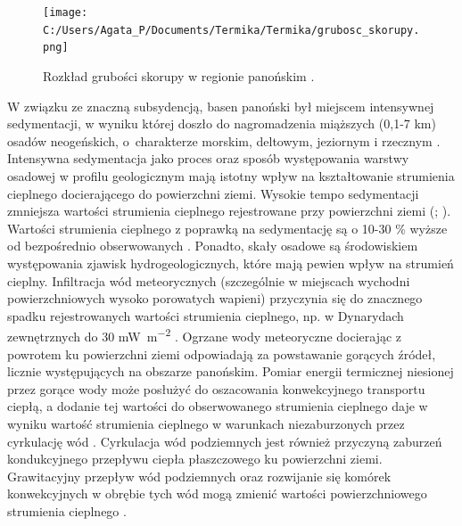 \documentclass[11.5pt,twoside]{report}
\begin{document}
\begin{figure}[h]
	\centering
	\texttt{[image: C:/Users/Agata\_P/Documents/Termika/Termika/grubosc\_skorupy.png]}
	\caption{Rozkład grubości skorupy w regionie panońskim \parencite{Horvath.2015}.}
	\label{fig:grubosc-skorupy}
\end{figure}

 W związku ze znaczną subsydencją, basen panoński był miejscem intensywnej sedymentacji, w wyniku której doszło do nagromadzenia miąższych (0,1-7 km) osadów neogeńskich, o~charakterze morskim, deltowym, jeziornym i rzecznym \parencite{Toth.2001}. Intensywna sedymentacja jako proces oraz sposób występowania warstwy osadowej w profilu geologicznym mają istotny wpływ na kształtowanie strumienia cieplnego docierającego do powierzchni ziemi. Wysokie tempo sedymentacji zmniejsza wartości strumienia cieplnego rejestrowane przy powierzchni ziemi (\cite{Lenkey.2017}; \cite{Horvath.2015}). Wartości strumienia cieplnego z poprawką na sedymentację są o 10-30 \% wyższe od bezpośrednio obserwowanych \parencite{Lenkey.2002}. Ponadto, skały osadowe są środowiskiem występowania zjawisk hydrogeologicznych, które mają pewien wpływ na strumień cieplny. Infiltracja wód meteorycznych (szczególnie w miejscach wychodni powierzchniowych wysoko porowatych wapieni) przyczynia się do znacznego spadku rejestrowanych wartości strumienia cieplnego, np. w Dynarydach zewnętrznych do 30 \si{\milli\watt\per\meter\squared} \parencite{Horvath.2015}. Ogrzane wody meteoryczne docierając z powrotem ku powierzchni ziemi odpowiadają za powstawanie gorących \'{z}ródeł, licznie występujących na obszarze panońskim. Pomiar energii termicznej niesionej przez gorące wody może posłużyć do oszacowania konwekcyjnego transportu ciepłą, a dodanie tej wartości do obserwowanego strumienia cieplnego daje w wyniku wartość strumienia cieplnego w warunkach niezaburzonych przez cyrkulację wód \parencite{Lenkey.2017}. Cyrkulacja wód podziemnych jest również przyczyną zaburzeń kondukcyjnego przepływu ciepła płaszczowego ku powierzchni ziemi. Grawitacyjny przepływ wód podziemnych oraz rozwijanie się komórek konwekcyjnych w obrębie tych wód mogą zmienić wartości powierzchniowego strumienia cieplnego \parencite{Horvath.2015}. 
 
\end{document}
